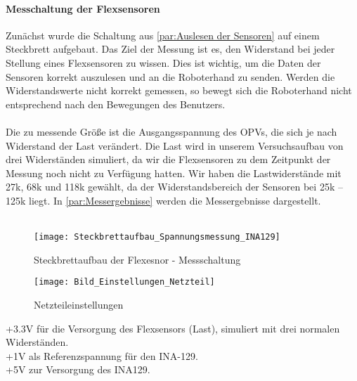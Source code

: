 \documentclass[titlepage,12pt,twoside]{article}
\begin{document}
\paragraph{Messchaltung der Flexsensoren}
\hfill \break
\hfill \break
Zunächst wurde die Schaltung aus \autoref{par:Auslesen der Sensoren} auf einem Steckbrett aufgebaut. Das Ziel der Messung ist es, den Widerstand 
bei jeder Stellung eines Flexsensoren zu wissen. Dies ist wichtig, um die Daten der Sensoren korrekt auszulesen und an die 
Roboterhand zu senden. Werden die Widerstandswerte nicht korrekt gemessen, so bewegt sich die Roboterhand nicht entsprechend 
nach den Bewegungen des Benutzers. \\
\\
Die zu messende Größe ist die Ausgangsspannung des OPVs, die sich je nach Widerstand der Last verändert. Die Last wird in 
unserem Versuchsaufbau von drei Widerständen simuliert, da wir die Flexsensoren zu dem Zeitpunkt der Messung noch nicht zu 
Verfügung hatten. Wir haben die Lastwiderstände mit 27k, 68k und 118k gewählt, da der Widerstandsbereich der Sensoren bei 
25k – 125k liegt. In \autoref{par:Messergebnisse} werden die Messergebnisse dargestellt. \\
\\
\begin{figure}[H]
	\begin{center}
		\scalebox{1.0}
		{\texttt{[image: Steckbrettaufbau\_Spannungsmessung\_INA129]}}
		\caption{Steckbrettaufbau der Flexesnor - Messschaltung}
		\label{fig:Steckbrettaufbau_Spannungsmessung_INA129}	
	\end{center}
\end{figure}
\hfill \break
\hfill \break
\begin{figure}[H]
	\begin{center}
		\scalebox{1.0}
		{\texttt{[image: Bild\_Einstellungen\_Netzteil]}}
		\caption{Netzteileinstellungen}
		\label{fig:Bild_Einstellungen_Netzteil}	
	\end{center}
\end{figure}
\hfill \break
+3.3V für die Versorgung des Flexsensors (Last), simuliert mit drei normalen Widerständen.\\
+1V als Referenzspannung für den INA-129.\\
+5V zur Versorgung des INA129.\\
\\
\end{document}
